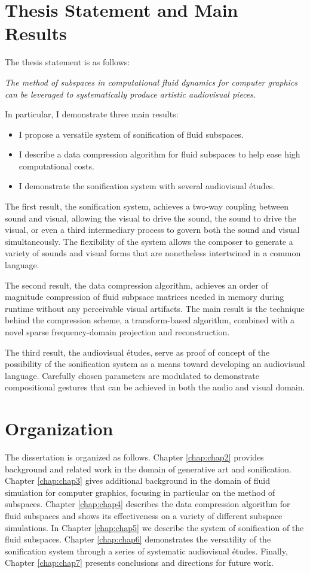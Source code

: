 \section{Thesis Statement and Main Results}
The thesis statement is as follows:

\begin{addmargin}[1em]{2em}
{\em The method of subspaces in computational fluid dynamics for computer graphics can be leveraged to systematically produce artistic audiovisual pieces.}
\end{addmargin}
In particular, I demonstrate three main results:

\begin{itemize}
	\item I propose a versatile system of sonification of fluid subspaces.
	\item I describe a data compression algorithm for fluid subspaces to help ease high computational costs.
	\item I demonstrate the sonification system with several audiovisual {\'e}tudes.
\end{itemize}

The first result, the sonification system, achieves a two-way coupling between sound and visual, allowing the visual to drive the sound, the sound to drive the visual, or even a third intermediary process to govern both the sound and visual simultaneously. The flexibility of the system allows the composer to generate a variety of sounds and visual forms that are nonetheless intertwined in a common language. 

The second result, the data compression algorithm, achieves an order of magnitude compression of fluid subpsace matrices needed in memory during runtime without any perceivable visual artifacts. The main result is the technique behind the compression scheme, a transform-based algorithm, combined with a novel sparse frequency-domain projection and reconstruction.

The third result, the audiovisual {\'e}tudes, serve as proof of concept of the possibility of the sonification system as a means toward developing an audiovisual language. Carefully chosen parameters are modulated to demonstrate compositional gestures that can be achieved in both the audio and visual domain. 

\section{Organization}
The dissertation is organized as follows. Chapter \ref{chap:chap2} provides background and related work in the domain of generative art and sonification. Chapter \ref{chap:chap3} gives additional background in the domain of fluid simulation for computer graphics, focusing in particular on the method of subspaces. Chapter \ref{chap:chap4} describes the data compression algorithm for fluid subspaces and shows its effectiveness on a variety of different subspace simulations. In Chapter \ref{chap:chap5} we describe the system of sonification of the fluid subspaces. Chapter \ref{chap:chap6} demonstrates the versatility of the sonification system through a series of systematic audiovisual {\'e}tudes. Finally, Chapter \ref{chap:chap7} presents conclusions and directions for future work.

